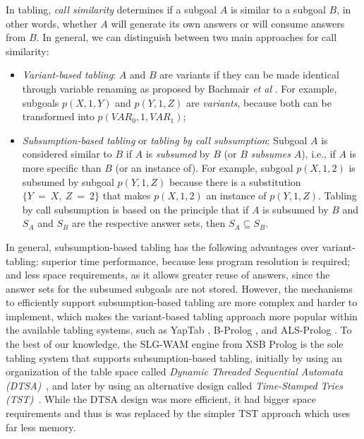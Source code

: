 In tabling, \emph{call similarity} determines if a subgoal $A$ is similar to a subgoal $B$,
in other words, whether $A$ will generate its own answers or will consume answers from $B$. In general,
we can distinguish between two main approaches for call similarity:

\begin{itemize}
   \item \emph{Variant-based tabling}: $A$ and $B$ are variants if they can be made identical
   through variable renaming as proposed by Bachmair \textit{et al} \cite{Bachmair-93}.
   For example, subgoals $p(X,1,Y)$ and $p(Y,1,Z)$ are \emph{variants},
   because both can be transformed into $p(VAR_0,1,VAR_1)$;
   \item \emph{Subsumption-based tabling} or \emph{tabling by call subsumption}: Subgoal $A$ is considered similar
   to $B$ if $A$ is \emph{subsumed} by $B$ (or $B$ \emph{subsumes} $A$), i.e., if $A$ is more specific than $B$
   (or an instance of). For example, subgoal $p(X,1,2)$ is subsumed by subgoal $p(Y,1,Z)$ because there
   is a substitution $\{Y~=~X,~Z~=~2\}$ that makes $p(X,1,2)$ an instance of $p(Y,1,Z)$. Tabling by call
   subsumption is based on the principle that if $A$ is subsumed by $B$ and $S_A$ and $S_B$ are the respective
   answer sets, then $S_A \subseteq S_B$.
\end{itemize}

In general, subsumption-based tabling has the following advantages over variant-tabling:
superior time performance, because less program resolution is required; and less space requirements,
as it allows greater reuse of answers, since the answer sets for the subsumed subgoals are not stored.
However, the mechanisms to efficiently support subsumption-based tabling are more complex and harder to
implement, which makes the variant-based tabling approach more popular within the available tabling systems,
such as YapTab \cite{Rocha-00a}, B-Prolog \cite{Zhou-00}, and ALS-Prolog \cite{Guo-01}.
To the best of our knowledge, the SLG-WAM \cite{Sagonas-98} engine from XSB Prolog is the sole tabling system that supports
subsumption-based tabling, initially by using an organization of the table space called
\emph{Dynamic Threaded Sequential Automata (DTSA)}~\cite{Rao-96}, and later by using an alternative design called
\emph{Time-Stamped Tries (TST)}~\cite{Johnson-99}.
While the DTSA design was more efficient, it had bigger space requirements and thus is was replaced by the simpler
TST approach which uses far less memory.

